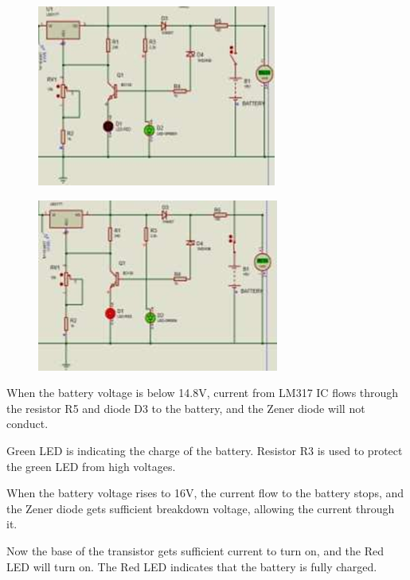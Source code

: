 \documentclass[twocolumn]{article}
\begin{document}
\begin{figure}[h]
    \centering
    \includegraphics{8.png}
    \label{fig:enter-label}
\end{figure}

\begin{figure}[h]
    \centering
    \includegraphics{9.png}
    \label{fig:enter-label}
\end{figure}

\noindent When the battery voltage is below 14.8V, current from LM317 IC flows through the resistor R5 and diode D3 to the battery, and the Zener diode will not conduct. 
\vspace{1pt}

\noindent Green LED is indicating the charge of the battery. Resistor R3 is used to protect the green LED from high voltages. 
\vspace{1pt}

\noindent When the battery voltage rises to 16V, the current flow to the battery stops, and the Zener diode gets sufficient breakdown voltage, allowing the current through it. 
\vspace{1pt}

\noindent Now the base of the transistor gets sufficient current to turn on, and the Red LED will turn on. The Red LED indicates that the battery is fully charged. 
\vspace{1pt}
\end{document}
